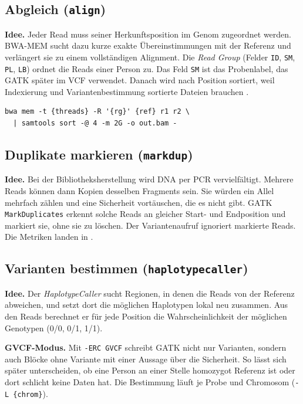 \documentclass[10pt,a4paper,twocolumn]{article}
\begin{document}
\subsection{Abgleich (\texttt{align})}
\textbf{Idee.} Jeder Read muss seiner Herkunftsposition im Genom zugeordnet werden. BWA-MEM \citep{li2013} sucht dazu kurze exakte Übereinstimmungen mit der Referenz und verlängert sie zu einem vollständigen Alignment. Die \emph{Read Group} (Felder \texttt{ID}, \texttt{SM}, \texttt{PL}, \texttt{LB}) ordnet die Reads einer Person zu. Das Feld \texttt{SM} ist das Probenlabel, das GATK später im VCF verwendet. Danach wird nach Position sortiert, weil Indexierung und Variantenbestimmung sortierte Dateien brauchen \citep{li2009}.

\begin{lstlisting}
bwa mem -t {threads} -R '{rg}' {ref} r1 r2 \
  | samtools sort -@ 4 -m 2G -o out.bam -
\end{lstlisting}

\subsection{Duplikate markieren (\texttt{markdup})}
\textbf{Idee.} Bei der Bibliotheksherstellung wird DNA per PCR vervielfältigt. Mehrere Reads können dann Kopien desselben Fragments sein. Sie würden ein Allel mehrfach zählen und eine Sicherheit vortäuschen, die es nicht gibt. GATK \texttt{MarkDuplicates} erkennt solche Reads an gleicher Start- und Endposition und markiert sie, ohne sie zu löschen. Der Variantenaufruf ignoriert markierte Reads. Die Metriken landen in .

\subsection{Varianten bestimmen (\texttt{haplotypecaller})}
\textbf{Idee.} Der \emph{HaplotypeCaller} \citep{mckenna2010} sucht Regionen, in denen die Reads von der Referenz abweichen, und setzt dort die möglichen Haplotypen lokal neu zusammen. Aus den Reads berechnet er für jede Position die Wahrscheinlichkeit der möglichen Genotypen (0/0, 0/1, 1/1).

\textbf{GVCF-Modus.} Mit \texttt{-ERC GVCF} schreibt GATK nicht nur Varianten, sondern auch Blöcke ohne Variante mit einer Aussage über die Sicherheit. So lässt sich später unterscheiden, ob eine Person an einer Stelle homozygot Referenz ist oder dort schlicht keine Daten hat. Die Bestimmung läuft je Probe und Chromosom (\texttt{-L \{chrom\}}).
\end{document}
